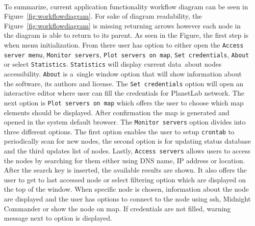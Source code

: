 {{{{{{{\paragraph{} To summarize, current application functionality workflow diagram can be seen in Figure~\ref{fig:workflowdiagram}. For sake of diagram readability, the Figure~\ref{fig:workflowdiagram} is missing returning arrows however each node in the diagram is able to return to its parent. As seen in the Figure, the first step is when menu initialization. From there user has option to either open the \texttt{Access server menu}, \texttt{Monitor servers}, \texttt{Plot servers on map}, \texttt{Set credentials}, \texttt{About} or select \texttt{Statistics}. \texttt{Statistics} will display current data~about nodes accessibility. \texttt{About} is a~single window option that will show information about the software, its authors and license. The \texttt{Set credentials} option will open an interactive editor where user can fill the credentials for PlanetLab network. The next option is \texttt{Plot servers on map} which offers the user to choose which map elements should be displayed. After confirmation the map is generated and opened in the system default browser. The \texttt{Monitor servers} option divides into three different options. The first option enables the user to setup \texttt{crontab} to periodically scan for new nodes, the second option is for updating status database and the third updates list of nodes. Lastly, \texttt{Access servers} allows users to access the nodes by searching for them either using DNS name, IP address or location. After the search key is inserted, the available results are shown. It also offers the user to get to last accessed node or select filtering option which are displayed on the top of the window. When specific node is chosen, information about the node are displayed and the user has options to connect to the node using ssh, Midnight Commander or show the node on map. If credentials are not filled, warning message next to option is displayed.

}}}}}}}
